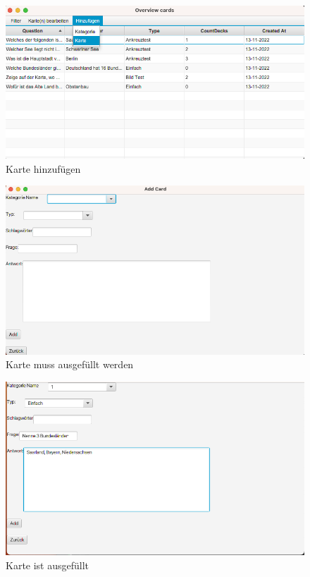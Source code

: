 \documentclass[fontsize=12pt,paper=a4,twoside]{scrartcl}
\begin{document}
\begin{figure}[h!]
	\caption{Karte hinzufügen}
	\label{fig:cards-1}
	\includegraphics[width=\textwidth]{cards-1.png}
\end{figure}
\begin{figure}[h!]
	\caption{Karte muss ausgefüllt werden}
	\label{fig:cards-2}
	\includegraphics[width=\textwidth]{cards-2.png}
\end{figure}
\begin{figure}[h!]
	\caption{Karte ist ausgefüllt}
	\label{fig:cards-3}
	\includegraphics[width=\textwidth]{cards-3.png}
\end{figure}
\end{document}
